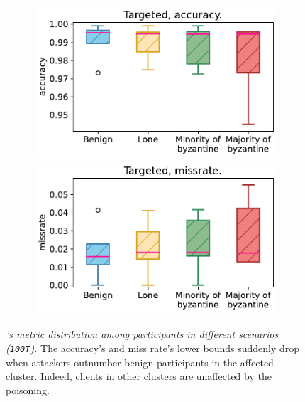 \begin{figure}[t]
  \begin{subfigure}[t]{1.0\linewidth}
    \centering 
    \includegraphics[width=0.4\linewidth]{figures/poisoning/trusfids_targeted_acc_all_distibutions.pdf} 
    \qquad   
    \includegraphics[width=0.4\linewidth]{figures/poisoning/trusfids_targeted_missrate_all_distibutions.pdf}   
\end{subfigure}
  \caption{
    \emph{\thecontrib's metric distribution among participants in different scenarios (\texttt{100T}).}
    The accuracy's and miss rate's lower bounds suddenly drop when attackers outnumber benign participants in the affected cluster.
    Indeed, clients in other clusters are unaffected by the poisoning.
    \label{fig:trustfids_accuracy_missrate_distribution}
  }
  
\end{figure}


